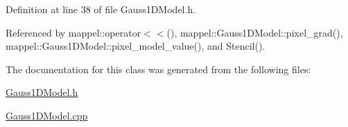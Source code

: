 Definition at line 38 of file Gauss1\+D\+Model.\+h.



Referenced by mappel\+::operator$<$$<$(), mappel\+::\+Gauss1\+D\+Model\+::pixel\+\_\+grad(), mappel\+::\+Gauss1\+D\+Model\+::pixel\+\_\+model\+\_\+value(), and Stencil().



The documentation for this class was generated from the following files\+:\begin{DoxyCompactItemize}
\item 
\hyperlink{Gauss1DModel_8h}{Gauss1\+D\+Model.\+h}\item 
\hyperlink{Gauss1DModel_8cpp}{Gauss1\+D\+Model.\+cpp}\end{DoxyCompactItemize}
